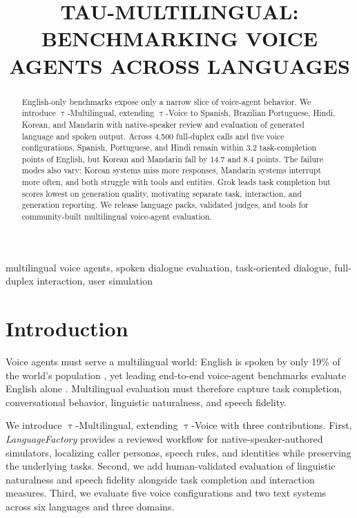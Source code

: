 \documentclass{article}
\title{TAU-MULTILINGUAL: BENCHMARKING VOICE AGENTS ACROSS LANGUAGES}
\newcommand{\tauvoice}{$\uptau$-Voice}
\newcommand{\taumulti}{$\uptau$-Multilingual}
\begin{document}
\maketitle

\fontsize{9.5pt}{11.4pt}\selectfont

\begin{abstract}
English-only benchmarks expose only a narrow slice of voice-agent behavior. We
introduce \taumulti{}, extending \tauvoice{} to Spanish, Brazilian Portuguese,
Hindi, Korean, and Mandarin with native-speaker review and evaluation
of generated language and spoken output. Across 4,500 full-duplex
calls and five voice configurations, Spanish, Portuguese, and Hindi remain
within 3.2 task-completion points of English, but Korean and Mandarin fall by
14.7 and 8.4 points. The failure
modes also vary: Korean systems miss more
responses, Mandarin systems interrupt more often, and both struggle with tools
and entities. Grok leads task completion but scores lowest on generation
quality, motivating separate task, interaction, and generation reporting.
We release language packs, validated judges, and tools
for community-built multilingual voice-agent evaluation.
\end{abstract}

\begin{keywords}
multilingual voice agents, spoken dialogue evaluation, task-oriented dialogue,
full-duplex interaction, user simulation
\end{keywords}

\section{Introduction}
\label{sec:introduction}

Voice agents must serve a multilingual world: English is spoken by only 19\% of
the world's population \cite{worldbank2025digital}, yet leading end-to-end voice-agent
benchmarks evaluate English alone
\cite{ray2026tauvoice,bogavelli2026evabench,lin2026fdbv3}.
Multilingual evaluation must therefore capture task completion, conversational
behavior, linguistic naturalness, and speech fidelity.

We introduce \taumulti{}, extending \tauvoice{} \cite{ray2026tauvoice} with three
contributions. First, \emph{LanguageFactory} provides a reviewed workflow for
native-speaker-authored simulators, localizing caller personas, speech rules,
and identities while preserving the underlying tasks. Second, we add
human-validated evaluation of linguistic naturalness and speech fidelity
alongside task completion and interaction measures. Third, we evaluate five
voice configurations and two text systems across six languages and three
domains.
\end{document}
